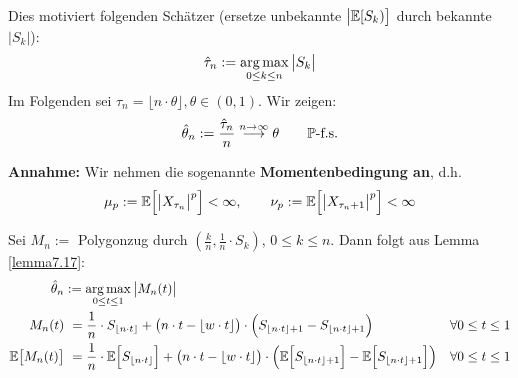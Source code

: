 Dies motiviert folgenden Schätzer (ersetze unbekannte $\big|\E[S_k)\big]$ durch bekannte $|S_k|$):
\begin{align*}
	\hat{\tau}_n:=\argmax\limits_{0\leq k\leq n}\big|S_k\big|
\end{align*}
Im Folgenden sei $\tau_n=\lfloor n\cdot\theta\rfloor,\theta\in(0,1)$.
Wir zeigen:
\begin{align*}
	\hat{\theta}_n:=\frac{\hat{\tau}_n}{n}\overset{n\to\infty}{\longrightarrow}\theta\qquad\P\text{-f.s.}
\end{align*}

\textbf{Annahme:} Wir nehmen die sogenannte \textbf{Momentenbedingung an}, d.h.
\begin{align*}
	\mu_p:=\E\Big[\big|X_{\tau_n}\big|^p\Big]<\infty,
	\qquad
	\nu_p:=\E\Big[\big|X_{\tau_n+1}\big|^p\Big]<\infty
\end{align*}

Sei $M_n:=$ Polygonzug durch $\left(\frac{k}{n},\frac{1}{n}\cdot S_k\right)$, $0\leq k\leq n$.
Dann folgt aus Lemma \ref{lemma7.17}:
\begin{align*}
	\hat{\theta}_n&:=\argmax\limits_{0\leq t\leq 1}\big|M_n(t)\big|\\
	M_n(t)&~=\frac{1}{n}\cdot S_{\lfloor n\cdot t\rfloor}+\big(n\cdot t-\lfloor w\cdot t\rfloor\big)\cdot\Big(S_{\lfloor n\cdot t\rfloor+1}-S_{\lfloor n\cdot t\rfloor+1}\Big) &\forall 0\leq t\leq 1\\
	\E\big[M_n(t)\big]&~=\frac{1}{n}\cdot\E\Big[ S_{\lfloor n\cdot t\rfloor}\Big]+\big(n\cdot t-\lfloor w\cdot t\rfloor\big)\cdot
	\Big(\E\Big[S_{\lfloor n\cdot t\rfloor+1}\Big]-\E\Big[S_{\lfloor n\cdot t\rfloor+1}\Big]\Big) &\forall 0\leq t\leq 1\\
\end{align*}

